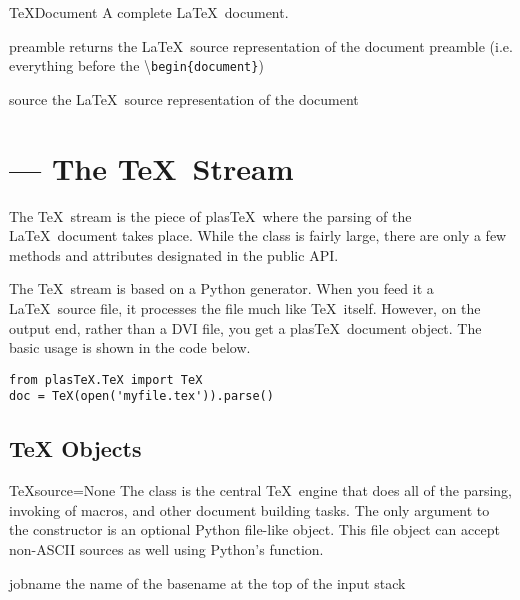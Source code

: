 \documentclass{manual}
\newcommand{\macro}[1]{\textbackslash\texttt{#1}}
\newcommand{\plasTeX}{plas\TeX}
\begin{document}
\begin{classdesc}{TeXDocument}{}
A complete \LaTeX\ document.
\end{classdesc}

\begin{memberdesc}[TeXDocument]{preamble}
returns the \LaTeX\ source representation of the document preamble 
(i.e. everything before the \macro{begin\{document\}})
\end{memberdesc}

\begin{memberdesc}[TeXDocument]{source}
the \LaTeX\ source representation of the document 
\end{memberdesc}


\section{ --- The \TeX\ Stream}


The \TeX\ stream is the piece of \plasTeX\ where the parsing of the
\LaTeX\ document takes place.  While the  class is fairly
large, there are only a few methods and attributes designated in the
public API.  

The \TeX\ stream is based on a Python generator.  When you feed it
a \LaTeX\ source file, it processes the file much like \TeX\ itself.
However, on the output end, rather than a DVI file, you get a 
\plasTeX\ document object.  The basic usage is shown in the code below.
\begin{verbatim}
from plasTeX.TeX import TeX
doc = TeX(open('myfile.tex')).parse()
\end{verbatim}

\subsection{TeX Objects}

\begin{classdesc}{TeX}{source=None}
The  class is the central \TeX\ engine that does all of the 
parsing, invoking of macros, and other document building tasks.  The
only argument to the constructor is an optional Python file-like object.
This file object can accept non-ASCII sources as well using Python's 
 function.  
\end{classdesc}

\begin{memberdesc}[TeX]{jobname}
the name of the basename at the top of the input stack
\end{memberdesc}
\end{document}
